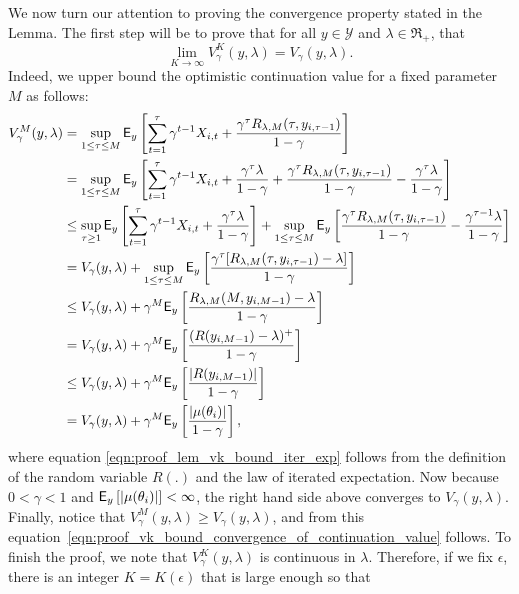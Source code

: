 \begin{myproof}[Proof.]
	We now turn our attention to proving the convergence property stated in the Lemma. The first step will be to prove that for all $y \in \mathcal{Y}$ and $\lambda \in \Re_+$, that 
	\begin{equation} \label{eqn:proof_vk_bound_convergence_of_continuation_value}
	\lim_{K \to \infty}V^K_\gamma(y, \lambda) = V_\gamma(y, \lambda).
	\end{equation}
	Indeed, we upper bound the optimistic continuation value for a fixed parameter $M$ as follows:
	\begin{align}
		V^M_\gamma(y, \lambda) & = \sup_{1 \le \tau \le M} \mathsf{E}_y\left[\sum_{t=1}^{\tau} \gamma^{t-1} X_{i,t} + \frac{\gamma^{\tau}R_{\lambda,M}(\tau, y_{i,\tau-1})}{1-\gamma}\right] \nonumber\\
		& = \sup_{1 \le \tau \le M} \mathsf{E}_y\left[\sum_{t=1}^{\tau} \gamma^{t-1} X_{i,t} + \frac{\gamma^{\tau}\lambda}{1-\gamma} + \frac{\gamma^{\tau}R_{\lambda,M}(\tau, y_{i,\tau-1})}{1-\gamma} - \frac{\gamma^{\tau}\lambda}{1-\gamma}\right] \nonumber \\
		& \le \sup_{\tau \ge 1} \mathsf{E}_y\left[\sum_{t=1}^{\tau } \gamma^{t-1} X_{i,t} + \frac{\gamma^{\tau}\lambda}{1-\gamma}\right] + \sup_{1 \le \tau \le M}\mathsf{E}_y\left[\frac{\gamma^{\tau}R_{\lambda,M}(\tau, y_{i,\tau-1})}{1-\gamma} - \frac{\gamma^{\tau -1}\lambda}{1-\gamma}\right] \nonumber \\
		& =V_{\gamma}(y, \lambda) + \sup_{1 \le \tau \le M}\mathsf{E}_y\left[\frac{\gamma^{\tau}[R_{\lambda,M}(\tau, y_{i,\tau-1})-\lambda]}{1-\gamma}\right] \nonumber \\
		& \le V_{\gamma}(y, \lambda)  + \gamma^{M}\mathsf{E}_y\left[\frac{R_{\lambda,M}(M, y_{i,M-1})-\lambda}{1-\gamma}\right] \nonumber \\
		& = V_{\gamma}(y, \lambda)  + \gamma^{M}\mathsf{E}_y\left[\frac{( R(y_{i,M-1}) - \lambda)^+}{1-\gamma}\right] \nonumber \\
		& \le V_{\gamma}(y, \lambda)  + \gamma^{M}\mathsf{E}_y\left[\frac{|R(y_{i,M-1})|}{1-\gamma}\right] \nonumber  \\
		& = V_{\gamma}(y, \lambda)  + \gamma^M \mathsf{E}_y\left[\frac{|\mu(\theta_i)|}{1-\gamma}\right] \label{eqn:proof_lem_vk_bound_iter_exp},
	\end{align}
	where equation \eqref{eqn:proof_lem_vk_bound_iter_exp} follows from the definition of the random variable $R(.)$ and the law of iterated expectation. Now because $0 < \gamma < 1$ and $\mathsf{E}_y\left[|\mu(\theta_i)|\right] < \infty$, the right hand side above converges to $V_{\gamma}(y, \lambda)$. Finally, notice that $V^M_\gamma(y, \lambda) \ge V_\gamma(y, \lambda)$, and from this equation~\eqref{eqn:proof_vk_bound_convergence_of_continuation_value} follows. To finish the proof, we note that $V^K_\gamma(y, \lambda)$ is continuous in $\lambda$. Therefore, if we fix $\epsilon$, there is an integer $K = K(\epsilon)$ that is large enough so that

\end{myproof}
